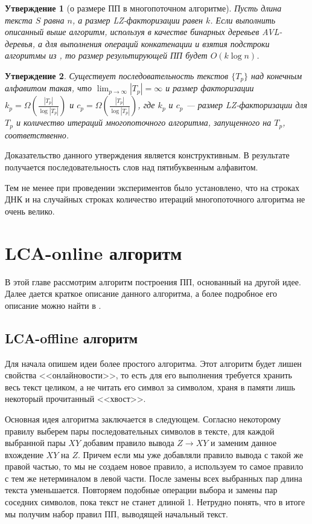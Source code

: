 \documentclass[14pt]{article}
\newtheorem{claim}{Утверждение}[section]
\begin{document}
\begin{claim}[о размере ПП в многопоточном алгоритме]
	Пусть длина текста $S$ равна $n$, а размер LZ-факторизации равен $k$. Если выполнить описанный выше алгоритм,
	используя в качестве бинарных деревьев AVL-деревья, а для выполнения операций конкатенации и взятия подстроки
	алгоритмы из \cite{RytterSLPConstruction}, то размер результирующей ПП будет $O(k\log n)$.
\end{claim}

\begin{claim}
\label{BadWordSequenceTheorem}
	Существует последовательность текстов $\{T_p\}$ над конечным алфавитом такая, что $\lim_{p \to \infty}|T_p| = \infty$
	и размер факторизации $k_p = \Omega\left(\frac{|T_p|}{\log|T_p|}\right)$ и $c_p = \Omega\left(\frac{|T_p|}{\log|T_p|}\right)$, где 
	$k_p$ и $c_p$ --- размер LZ-факторизации для $T_p$ и количество итераций многопоточного алгоритма,
	запущенного на $T_p$, соответственно.
\end{claim}

Доказательство данного утверждения является конструктивным. В результате получается последовательность
слов над пятибуквенным алфавитом.

Тем не менее при проведении экспериментов было установлено, что на строках ДНК и на случайных строках
количество итераций многопоточного алгоритма не очень велико.

\section{LCA-online алгоритм}

В этой главе рассмотрим алгоритм построения ПП, основанный на другой идее. Далее дается краткое описание
данного алгоритма, а более подробное его описание можно найти в \cite{LCAOnlineSLP}.

\subsection{LCA-offline алгоритм}

Для начала опишем идеи более простого алгоритма. Этот алгоритм будет лишен свойства <<онлайновости>>,
то есть для его выполнения требуется хранить весь текст целиком, а не читать его символ за символом,
храня в памяти лишь некоторый прочитанный <<хвост>>.

Основная идея алгоритма заключается в следующем. Согласно некоторому правилу выберем пары
последовательных символов в тексте, для каждой выбранной пары $XY$ добавим правило вывода $Z \to XY$
и заменим данное вхождение $XY$ на $Z$. Причем если мы уже добавляли правило вывода с такой же правой
частью, то мы не создаем новое правило, а используем то самое правило с тем же нетерминалом в левой части.
После замены всех выбранных пар длина текста уменьшается. Повторяем подобные операции выбора и замены пар соседних
символов, пока текст не станет длиной 1. Нетрудно понять, что в итоге мы получим набор правил ПП, выводящей начальный текст.
\end{document}
